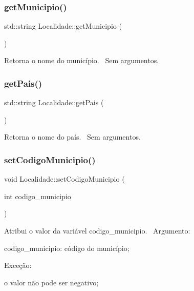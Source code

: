 \subsubsection{\texorpdfstring{get\+Municipio()}{getMunicipio()}}
{\footnotesize\ttfamily std\+::string Localidade\+::get\+Municipio (\begin{DoxyParamCaption}{ }\end{DoxyParamCaption})}

Retorna o nome do município.~\newline
Sem argumentos.\mbox{\label{classLocalidade_a03249330040cf75b6a964cced77526cf}} 
\subsubsection{\texorpdfstring{get\+Pais()}{getPais()}}
{\footnotesize\ttfamily std\+::string Localidade\+::get\+Pais (\begin{DoxyParamCaption}{ }\end{DoxyParamCaption})}

Retorna o nome do país.~\newline
Sem argumentos.\mbox{\label{classLocalidade_a38bb0027272b4b39b88698dc5820fbc6}} 
\subsubsection{\texorpdfstring{set\+Codigo\+Municipio()}{setCodigoMunicipio()}}
{\footnotesize\ttfamily void Localidade\+::set\+Codigo\+Municipio (\begin{DoxyParamCaption}\item[{int}]{codigo\+\_\+municipio }\end{DoxyParamCaption})}

Atribui o valor da variável codigo\+\_\+municipio.~\newline
 Argumento\+:
\begin{DoxyItemize}
\item codigo\+\_\+municipio\+: código do município;
\end{DoxyItemize}

Exceção\+:
\begin{DoxyItemize}
\item o valor não pode ser negativo;
\end{DoxyItemize}\mbox{\label{classLocalidade_a71acb8cadaee73dbdf27a244cc9d5135}} 
